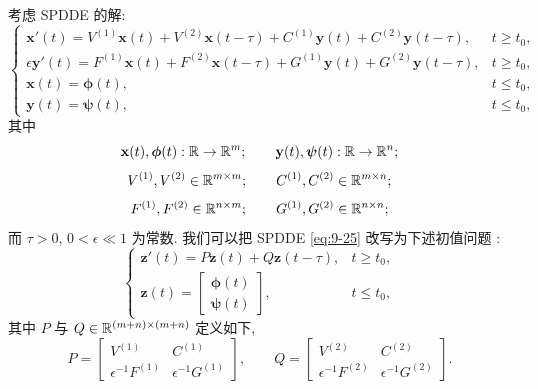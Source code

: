 考虑 SPDDE 的解:
\begin{equation}
  \left\{
  \begin{array}{ll}
    \mathbf{x}'(t)=V^{(1)}\mathbf{x}(t)+V^{(2)}\mathbf{x}(t-\tau)
      +C^{(1)}\mathbf{y}(t)+C^{(2)}\mathbf{y}(t-\tau), & t\geqslant t_0,\\
    \epsilon\mathbf{y}'(t)=F^{(1)}\mathbf{x}(t)+F^{(2)}\mathbf{x}(t-\tau)
      +G^{(1)}\mathbf{y}(t)+G^{(2)}\mathbf{y}(t-\tau), & t\geqslant t_0,\\
    \mathbf{x}(t)=\boldsymbol{\phi}(t), & t\leqslant t_0,\\
    \mathbf{y}(t)=\boldsymbol{\psi}(t), & t\leqslant t_0,
  \end{array}
  \right.
  \label{eq:9-25}
\end{equation}
其中
\[
  \mathbf{x}(t),\boldsymbol{\phi}(t):\mathbb{R}\to\mathbb{R}^m;\qquad
  \mathbf{y}(t),\boldsymbol{\psi}(t):\mathbb{R}\to\mathbb{R}^n;
\]
\[
  V^{(1)},V^{(2)}\in\mathbb{R}^{m\times m};\qquad
  C^{(1)},C^{(2)}\in\mathbb{R}^{m\times n};
\]
\[
  F^{(1)},F^{(2)}\in\mathbb{R}^{n\times m};\qquad
  G^{(1)},G^{(2)}\in\mathbb{R}^{n\times n};
\]
而 $\tau>0$, $0<\epsilon\ll1$ 为常数. 我们可以把 SPDDE \eqref{eq:9-25} 改写为下述初值问题 \cite{src:45}:
\begin{equation}
  \left\{
  \begin{array}{ll}
    \mathbf{z}'(t)=P\mathbf{z}(t)+Q\mathbf{z}(t-\tau), & t\geqslant t_0,\\
    \mathbf{z}(t)=\left[\begin{array}{c}
      \boldsymbol{\phi}(t)\\
      \boldsymbol{\psi}(t)
    \end{array}\right], & t\leqslant t_0,
  \end{array}
  \right.
  \label{eq:9-26}
\end{equation}
其中 $P$ 与 $Q\in\mathbb{R}^{(m+n)\times(m+n)}$ 定义如下,
\[
  P=\begin{bmatrix}
    V^{(1)} & C^{(1)}\\
    \epsilon^{-1}F^{(1)} & \epsilon^{-1}G^{(1)}
  \end{bmatrix},\qquad
  Q=\begin{bmatrix}
    V^{(2)} & C^{(2)}\\
    \epsilon^{-1}F^{(2)} & \epsilon^{-1}G^{(2)}
  \end{bmatrix}.
\]

